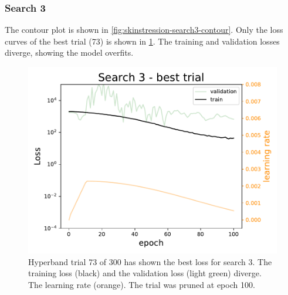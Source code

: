 \subsubsection{Search 3}
The contour plot is shown in \cref{fig:skinstression-search3-contour}.
Only the loss curves of the best trial (73) is shown in \cref{fig:skinstression-search3-best-loss}.
The training and validation losses diverge, showing the model overfits.

\begin{figure}
    \centering
    \includegraphics[]{skinstression/images/hyperparameter-search/search-3/best-trial-loss.pdf}
    \caption[Best loss curve of search 3]{
        Hyperband trial 73 of 300 has shown the best loss for search 3.
        The training loss (black) and the validation loss (light green) diverge.
        The learning rate (orange).
        The trial was pruned at epoch 100.
    }
    \label{fig:skinstression-search3-best-loss}
\end{figure}


